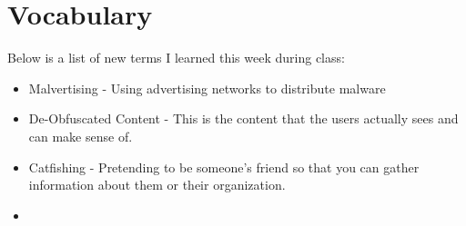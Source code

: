\documentclass[letterpaper, onecolumn,10pt]{IEEEtran}
\begin{document}
                
            \section{Vocabulary}
            Below is a list of new terms I learned this week during class:
            \begin{itemize}
                \item Malvertising - Using advertising networks to distribute malware\\
                \item De-Obfuscated Content - This is the content that the users actually sees and can make sense of.\\
                \item Catfishing - Pretending to be someone's friend so that you can gather information about them or their organization.\\
                \item 
            \end{itemize}
                
		
\end{document}
